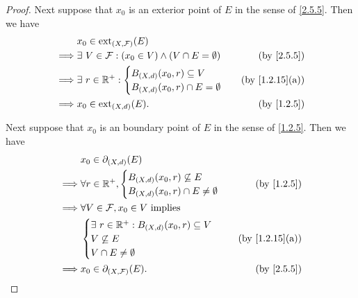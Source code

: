\begin{proof}
  Next suppose that \(x_0\) is an exterior point of \(E\) in the sense of \cref{2.5.5}.
  Then we have
  \begin{align*}
             & x_0 \in \text{ext}_{(X, \mathcal{F})}(E)                                                         \\
    \implies & \exists\ V \in \mathcal{F} : (x_0 \in V) \land (V \cap E = \emptyset) & \text{(by \cref{2.5.5})} \\
    \implies & \exists\ r \in \R^+ : \begin{cases}
                                       B_{(X, d)}(x_0, r) \subseteq V \\
                                       B_{(X, d)}(x_0, r) \cap E = \emptyset
                                     \end{cases}                                 & \text{(by \cref{1.2.15}(a))} \\
    \implies & x_0 \in \text{ext}_{(X, d)}(E).                                       & \text{(by \cref{1.2.5})}
  \end{align*}

  Next suppose that \(x_0\) is an boundary point of \(E\) in the sense of \cref{1.2.5}.
  Then we have
  \begin{align*}
             & x_0 \in \partial_{(X, d)}(E)                                                       \\
    \implies & \forall r \in \R^+, \begin{cases}
                                     B_{(X, d)}(x_0, r) \not\subseteq E \\
                                     B_{(X, d)}(x_0, r) \cap E \neq \emptyset
                                   \end{cases}                & \text{(by \cref{1.2.5})}          \\
    \implies & \forall V \in \mathcal{F}, x_0 \in V \text{ implies}                               \\
             & \begin{cases}
                 \exists\ r \in \R^+ : B_{(X, d)}(x_0, r) \subseteq V \\
                 V \not\subseteq E                                    \\
                 V \cap E \neq \emptyset
               \end{cases} & \text{(by \cref{1.2.15}(a))}                               \\
    \implies & x_0 \in \partial_{(X, \mathcal{F})}(E).                 & \text{(by \cref{2.5.5})}
  \end{align*}


\end{proof}
